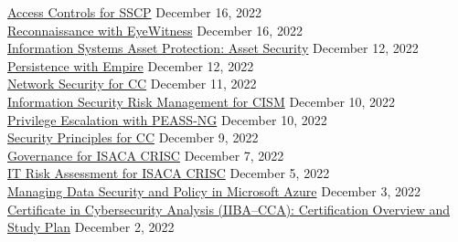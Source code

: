 \documentclass[10pt]{res} %
\begin{document}
\begin{resume}
\href{https://bjdelacruz.dev/files/certificates/pluralsight/2_Access_Controls_for_SSCP.pdf}{\color{blue}Access Controls for SSCP\textsuperscript{\textregistered}} \hfill December 16, 2022 \\
\href{https://bjdelacruz.dev/files/certificates/pluralsight/11_Reconnaissance_with_EyeWitness.pdf}{\color{blue}Reconnaissance with EyeWitness} \hfill December 16, 2022 \\
\href{https://bjdelacruz.dev/files/certificates/pluralsight/10_Information_Systems_Asset_Protection_Asset_Security.pdf}{\color{blue}Information Systems Asset Protection: Asset Security} \hfill December 12, 2022 \\
\href{https://bjdelacruz.dev/files/certificates/pluralsight/23_Persistence_with_Empire.pdf}{\color{blue}Persistence with Empire} \hfill December 12, 2022 \\
\href{https://bjdelacruz.dev/files/certificates/pluralsight/4_Network_Security_for_CC.pdf}{\color{blue}Network Security for CC\textservicemark} \hfill December 11, 2022 \\
\href{https://bjdelacruz.dev/files/certificates/pluralsight/2_Information_Security_Risk_Management_for_CISM.pdf}{\color{blue}Information Security Risk Management for CISM\textsuperscript{\textregistered}} \hfill December 10, 2022 \\
\href{https://bjdelacruz.dev/files/certificates/pluralsight/30_Privilege_Escalation_with_PEASS_NG.pdf}{\color{blue}Privilege Escalation with PEASS-NG} \hfill December 10, 2022 \\
\href{https://bjdelacruz.dev/files/certificates/pluralsight/1_Security_Principles_for_CC.pdf}{\color{blue}Security Principles for CC\textservicemark} \hfill December 9, 2022 \\
\href{https://bjdelacruz.dev/files/certificates/pluralsight/1_Governance_for_ISACA_CRISC.pdf}{\color{blue}Governance for ISACA\textsuperscript{\textregistered} CRISC\texttrademark} \hfill December 7, 2022 \\
\href{https://bjdelacruz.dev/files/certificates/pluralsight/2_IT_Risk_Assessment_for_ISACA_CRISC.pdf}{\color{blue}IT Risk Assessment for ISACA\textsuperscript{\textregistered} CRISC\texttrademark} \hfill December 5, 2022 \\
\href{https://bjdelacruz.dev/files/certificates/pluralsight/Managing_Data_Security_and_Policy_in_Microsoft_Azure.pdf}{\color{blue}Managing Data Security and Policy in Microsoft Azure} \hfill December 3, 2022 \\
\href{https://bjdelacruz.dev/files/certificates/pluralsight/9_Certificate_in_Cybersecurity_Analysis_IIBA_CCA_Certification_Overview_and_Study_Plan.pdf}{\color{blue}Certificate in Cybersecurity Analysis (IIBA\textsuperscript{\textregistered}--CCA): Certification Overview and Study Plan} \hfill December 2, 2022 \\

\end{resume}
\end{document}
